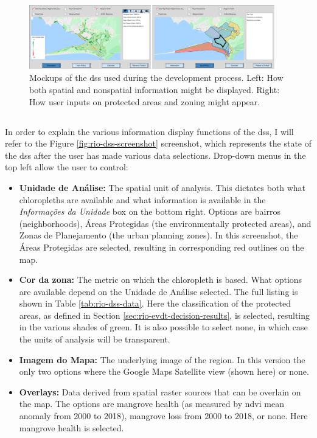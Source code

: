 \begin{figure}[!htb] 
\centering
\includegraphics[width=0.95\textwidth]{Figures/chap4/display_and_input.png}
\caption[Rio DSS Mockups]{Mockups of the \ac{dss} used during the development process. Left: How both spatial and nonspatial information might be displayed. Right: How user inputs on protected areas and zoning might appear.}
\label{fig:mockup}
\end{figure}

\subsection{}

In order to explain the various information display functions of the \ac{dss}, I will refer to the Figure \ref{fig:rio-dss-screenshot} screenshot, which represents the state of the \ac{dss} after the user has made various data selections. Drop-down menus in the top left allow the user to control:

\begin{itemize}[itemsep=0pt,parsep=0pt]
	\item{\textbf{Unidade de Análise:} The spatial unit of analysis. This dictates both what chloropleths are available and what information is available in the \textit{Informações da Unidade} box on the bottom right. Options are bairros (neighborhoods), Áreas Protegidas (the environmentally protected areas), and Zonas de Planejamento (the urban planning zones). In this screenshot, the Áreas Protegidas are selected, resulting in corresponding red outlines on the map.}
	\item{\textbf{Cor da zona:} The metric on which the chloropleth is based. What options are available depend on the Unidade de Análise selected. The full listing is shown in Table \ref{tab:rio-dss-data}. Here the classification of the protected areas, as defined in Section \ref{sec:rio-evdt-decision-results}, is selected, resulting in the various shades of green. It is also possible to select none, in which case the units of analysis will be transparent.}
	\item{\textbf{Imagem do Mapa:} The underlying image of the region. In this version the only two options where the Google Maps Satellite view (shown here) or none.}
	\item{\textbf{Overlays:} Data derived from spatial raster sources that can be overlain on the map. The options are mangrove health (as measured by \ac{ndvi} mean anomaly from 2000 to 2018), mangrove loss from 2000 to 2018, or none. Here mangrove health is selected.} 
\end{itemize}

